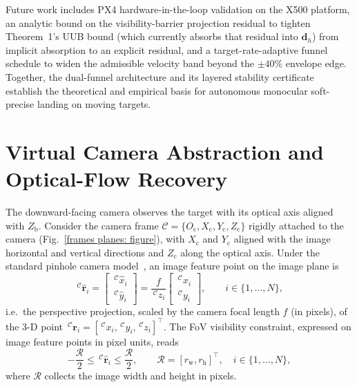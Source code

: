 \documentclass{IEEEtaes}
\begin{document}
Future work includes PX4 hardware-in-the-loop validation on the X500 platform, an analytic bound on the visibility-barrier projection residual to tighten Theorem~1's UUB bound (which currently absorbs that residual into $\boldsymbol{d}_h$) from implicit absorption to an explicit residual, and a target-rate-adaptive funnel schedule to widen the admissible velocity band beyond the $\pm 40\%$ envelope edge. Together, the dual-funnel architecture and its layered stability certificate establish the theoretical and empirical basis for autonomous monocular soft-precise landing on moving targets.

\appendices
\section{Virtual Camera Abstraction and Optical-Flow Recovery} \label{virtual camera: section}
The downward-facing camera observes the target with its optical axis aligned with $Z_\text{b}$. Consider the camera frame $\mathcal{C}=\{O_{\text{c}},X_{\text{c}},Y_{\text{c}},Z_{\text{c}}\}$ rigidly attached to the camera (Fig.~\ref{frames planes: figure}), with $X_{\text{c}}$ and $Y_{\text{c}}$ aligned with the image horizontal and vertical directions and $Z_{\text{c}}$ along the optical axis. Under the standard pinhole camera model~\cite{chaumette2006}, an image feature point on the image plane is
\begin{equation}
\label{pinhole camera model: equation}
    \,^\mathcal{C}\hat{\boldsymbol{r}}_i = \begin{bmatrix} \,^\mathcal{C}\hat{x}_i \\ \,^\mathcal{C}\hat{y}_i \end{bmatrix}
    = \frac{f}{\,^\mathcal{C}z_i}\begin{bmatrix} \,^\mathcal{C}x_i \\ \,^\mathcal{C}y_i \end{bmatrix},\qquad i\in\{1,\ldots,N\},
\end{equation}
i.e.\ the perspective projection, scaled by the camera focal length $f$ (in pixels), of the 3-D point $\,^\mathcal{C}\boldsymbol{r}_i=[\,^\mathcal{C}x_i,\,^\mathcal{C}y_i,\,^\mathcal{C}z_i]^{\top}$. The FoV visibility constraint, expressed on image feature points in pixel units, reads
\begin{equation} \label{visibility constraint: equation}
    -\frac{\mathcal{R}}{2} \le \,^\mathcal{C}\hat{\boldsymbol{r}}_i \le \frac{\mathcal{R}}{2},\qquad \mathcal{R}=[r_\text{w},r_\text{h}]^\top,\quad i\in\{1,\ldots,N\},
\end{equation}
where $\mathcal{R}$ collects the image width and height in pixels.
\end{document}
